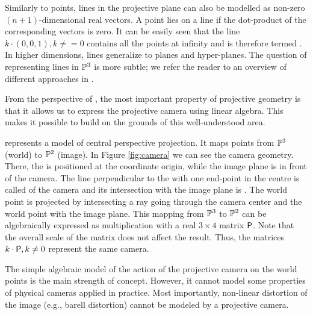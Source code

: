 Similarly to points, lines in the projective plane can also be modelled as non-zero $(n + 1)$-dimensional real vectors. 
A point lies on a line if the dot-product of the corresponding vectors is zero. 
It can be easily seen that the line $k \cdot (0, 0, 1), k \neq = 0$ contains all the points at infinity and is therefore termed . 
In higher dimensions, lines generalize to planes and hyper-planes. 
The question of representing lines in $\P^3$ is more subtle; we refer the reader to an overview of different approaches in \cite{multipleview}. %

From the perspective of \cv, the most important property of projective geometry is that it allows us to express the projective camera using linear algebra. 
This makes it possible to build on the grounds of this well-understood area.

 represents a model of central perspective projection.
It maps points from $\P^3$ (world) to $\P^2$ (image).
In Figure \ref{fig:camera} we can see the camera geometry.
There, the  is positioned at the coordinate origin, while the image plane is in front of the camera.
The line perpendicular to the  with one end-point in the centre is called  of the camera and its intersection with the image plane is .
The world point is projected by intersecting a ray going through the camera center and the world point with the image plane. 
This mapping from $\P^3$ to $\P^2$ can be algebraically expressed as multiplication with a real $3 \times 4$ matrix $\Proj$. 
Note that the overall scale of the matrix does not affect the result. 
Thus, the matrices $k \cdot \Proj, k \neq 0$ represent the same camera. %

The simple algebraic model of the action of the projective camera on the world points is the main strength of concept. 
However, it cannot model some properties of physical cameras applied in practice. 
Most importantly, non-linear distortion of the image (e.g., barell distortion) cannot be modeled by a projective camera. 

